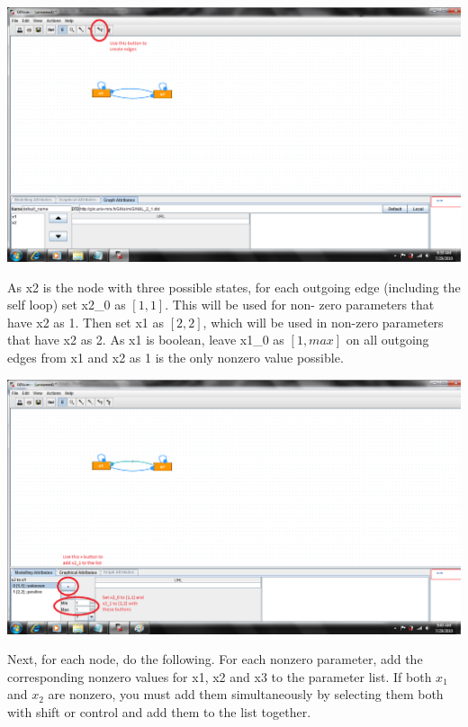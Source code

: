 \documentclass[12pt]{article}
\begin{document}
\begin{center}
\includegraphics[scale=.43]{createedges.png}
\end{center}

 As x2 is the node with three possible states, for 
each outgoing edge (including the self loop) set x2\_0 as $[1,1]$. This will be used for non-
zero parameters that have x2 as 1. Then set x1 as $[2,2]$, which will be used in non-zero 
parameters that have x2 as 2. As x1 is boolean, leave x1\_0 as $[1,max]$ on all outgoing edges 
from x1 and x2 as 1 is the only nonzero value possible.

\begin{center}
\includegraphics[scale=.43]{setedges.png}
\end{center}


 Next, for each node, do the following. For each nonzero parameter, add the corresponding nonzero values for x1, x2 and x3 
to the parameter list. If both $x_{1}$ and $x_{2}$ are nonzero, you must add them simultaneously by selecting them both with shift or control and add them to the list together. 
\end{document}
